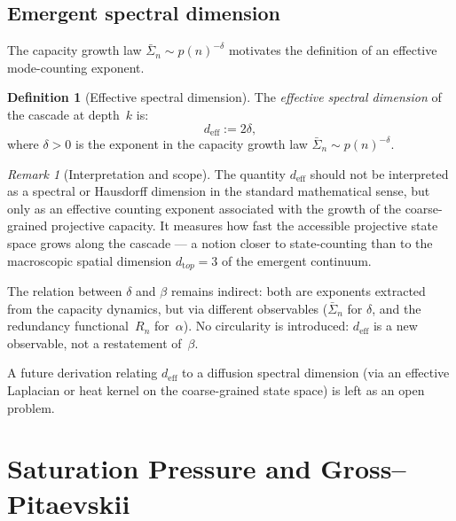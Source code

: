 \documentclass[11pt,a4paper]{article}
\theoremstyle{definition}
\newtheorem{definition}[theorem]{Definition}
\theoremstyle{remark}
\newtheorem{remark}[theorem]{Remark}
\begin{document}
  \subsection{Emergent spectral dimension}
    \label{ssec:deff}

    The capacity growth law $\bar\Sigma_n \sim p(n)^{-\delta}$ motivates the definition
    of an effective mode-counting exponent.

    \begin{definition}[Effective spectral dimension]
      \label{def:deff}
      The \emph{effective spectral dimension} of the cascade at depth~$k$ is:
      \begin{equation}
        \label{eq:deff}
        d_{\mathrm{eff}} := 2\delta,
      \end{equation}
      where $\delta > 0$ is the exponent in the capacity growth law $\bar\Sigma_n \sim p(n)^{-\delta}$.
    \end{definition}

    \begin{remark}[Interpretation and scope]
      \label{rem:deff-scope}
      The quantity $d_{\mathrm{eff}}$ should not be interpreted as a spectral or Hausdorff
      dimension in the standard mathematical sense, but only as an effective counting exponent
      associated with the growth of the coarse-grained projective capacity.
      It measures how fast the accessible projective state space grows along the cascade ---
      a notion closer to state-counting than to the macroscopic spatial dimension
      $d_{\mathrm top} = 3$ of the emergent continuum.

      The relation between $\delta$ and $\beta$ remains indirect: both are exponents
      extracted from the capacity dynamics, but via different observables
      ($\bar\Sigma_n$ for $\delta$, and the redundancy functional~$R_n$ for~$\alpha$).
      No circularity is introduced: $d_{\mathrm{eff}}$ is a new observable, not a
      restatement of~$\beta$.

      A future derivation relating $d_{\mathrm{eff}}$ to a diffusion spectral dimension
      (via an effective Laplacian or heat kernel on the coarse-grained state space)
      is left as an open problem.
    \end{remark}

  \section{Saturation Pressure and Gross--Pitaevskii}
  \label{sec:pressure}
\end{document}

